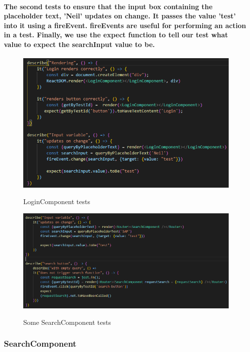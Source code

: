 \paragraph{The second tests to ensure that the input box containing the placeholder text, 'Neil' updates on change. It passes the value 'test' into it using a \textbf{fireEvent}. fireEvents are useful for performing an action in a test. Finally, we use the \textbf{expect} function to tell our test what value to expect the searchInput value to be.}
\begin{figure}[ht]
    \centering
    \includegraphics[scale=0.5]{Images/5.png} 
    \label{test5_label}
    \caption{LoginComponent tests}
\end{figure}
\begin{figure}[ht]
    \centering
    \includegraphics[scale=0.4]{Images/test3.png} 
    \label{test3_label}
    \caption{Some SearchComponent tests}
\end{figure}

\newpage
\subsubsection{SearchComponent}
